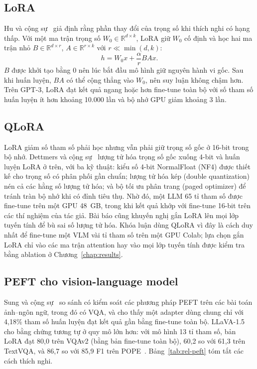 \subsection{LoRA}

Hu và cộng sự~\cite{hu2022lora} giả định rằng phần thay đổi của trọng số khi thích nghi có hạng
thấp. Với một ma trận trọng số $W_0 \in \mathbb{R}^{d \times k}$, LoRA giữ $W_0$
cố định và học hai ma trận nhỏ $B \in \mathbb{R}^{d \times r}$,
$A \in \mathbb{R}^{r \times k}$ với $r \ll \min(d, k)$:
\begin{equation}
  h = W_0 x + \frac{\alpha}{r} B A x .
  \label{eq:lora}
\end{equation}
$B$ được khởi tạo bằng 0 nên lúc bắt đầu mô hình giữ nguyên hành vi gốc. Sau khi
huấn luyện, $BA$ có thể cộng thẳng vào $W_0$, nên suy luận không chậm hơn. Trên
GPT-3, LoRA đạt kết quả ngang hoặc hơn fine-tune toàn bộ với số tham số huấn
luyện ít hơn khoảng 10.000 lần và bộ nhớ GPU giảm khoảng 3 lần.

\subsection{QLoRA}

LoRA giảm số tham số phải học nhưng vẫn phải giữ trọng số gốc ở 16-bit trong bộ
nhớ. Dettmers và cộng sự~\cite{dettmers2023qlora} lượng tử hóa trọng số gốc xuống 4-bit và huấn
luyện LoRA ở trên, với ba kỹ thuật: kiểu số 4-bit NormalFloat (NF4) được thiết
kế cho trọng số có phân phối gần chuẩn; lượng tử hóa kép (double quantization)
nén cả các hằng số lượng tử hóa; và bộ tối ưu phân trang (paged optimizer) để
tránh tràn bộ nhớ khi có đỉnh tiêu thụ. Nhờ đó, một LLM 65 tỉ tham số được
fine-tune trên một GPU 48~GB, trong khi kết quả khớp với fine-tune 16-bit trên các
thí nghiệm của tác giả. Bài báo cũng khuyến nghị gắn LoRA lên mọi lớp tuyến tính
để bù sai số lượng tử hóa. Khóa luận dùng QLoRA vì đây là cách duy nhất để
fine-tune một VLM vài tỉ tham số trên một GPU Colab; lựa chọn gắn LoRA chỉ vào các
ma trận attention hay vào mọi lớp tuyến tính được kiểm tra bằng ablation ở
Chương~\ref{chap:results}.

\subsection{PEFT cho vision-language model}

Sung và cộng sự~\cite{sung2022vladapter} so sánh có kiểm soát các phương pháp PEFT trên các bài
toán ảnh--ngôn ngữ, trong đó có VQA, và cho thấy một adapter dùng chung chỉ với
4,18\% tham số huấn luyện đạt kết quả gần bằng fine-tune toàn bộ. LLaVA-1.5 cho
bằng chứng tương tự ở quy mô lớn hơn: với mô hình 13 tỉ tham số, bản LoRA đạt
80,0 trên VQAv2 (bằng bản fine-tune toàn bộ), 60,2 so với 61,3 trên TextVQA, và
86,7 so với 85,9 F1 trên POPE~\cite{liu2024llava15}. Bảng~\ref{tab:rel-peft} tóm
tắt các cách thích nghi.

